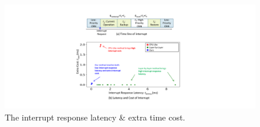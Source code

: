
  

\begin{figure}[t]
  \centering
  \includegraphics[width=0.99\linewidth]{fig/PRresult.pdf}
  \caption{The interrupt response latency \& extra time cost.}
  \label{fig:scatter1024}
\end{figure}


